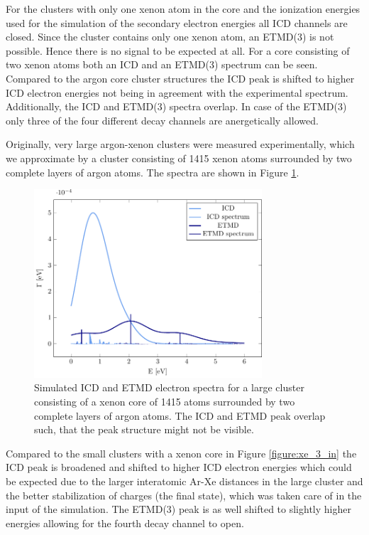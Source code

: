 For the clusters with only one xenon atom in the core and the ionization
energies used for the simulation of the secondary electron energies
all ICD channels are closed. Since the cluster contains only one xenon atom,
an ETMD(3) is not possible. Hence there is no signal to be expected at all.
For a core consisting of two xenon atoms both an ICD and an ETMD(3) spectrum
can be seen. Compared to the argon core cluster structures the ICD peak is
shifted to higher ICD electron energies not being in agreement with
the experimental spectrum. Additionally, the ICD and ETMD(3) spectra overlap.
In case of the ETMD(3) only three of the four different decay channels are
anergetically allowed.


Originally, very large argon-xenon clusters were measured experimentally,
which we approximate by a cluster consisting of 1415 xenon atoms surrounded
by two complete layers of argon atoms. The spectra are shown in Figure
\ref{figure:xe_8_lay1}.

\begin{figure}[h]
 \centering
 \includegraphics[width=8.5cm]{pics/xe_8_1lay.pdf}
 \caption{Simulated ICD and ETMD electron spectra for a large cluster consisting
          of a xenon core of 1415 atoms surrounded by two complete layers of
          argon atoms. The ICD and ETMD peak overlap such, that the peak structure
          might not be visible.}
 \label{figure:xe_8_lay1}
\end{figure}

Compared to the small clusters with a xenon core in Figure \ref{figure:xe_3_in}
the ICD peak is broadened and shifted to higher ICD electron energies which could be
expected due to the larger interatomic Ar-Xe distances in the large cluster and
the better stabilization of charges (the final state), which was taken care of
in the input of the simulation.
The ETMD(3) peak is as well shifted to slightly higher energies allowing for the
fourth decay channel to open.
